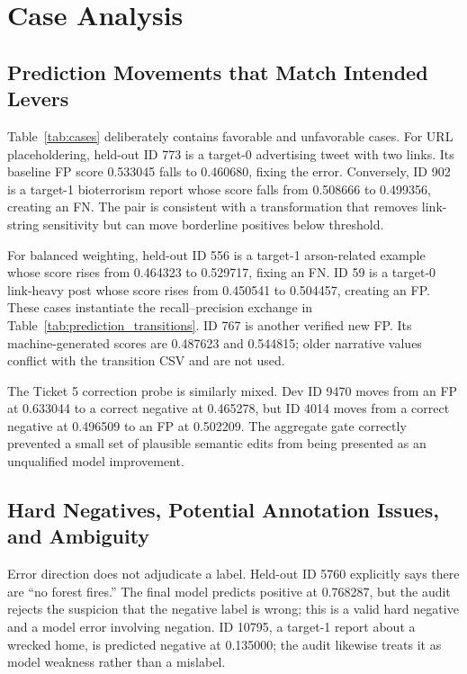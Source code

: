 \documentclass[conference]{IEEEtran}
\begin{document}
\section{Case Analysis}

\subsection{Prediction Movements that Match Intended Levers}

Table~\ref{tab:cases} deliberately contains favorable and unfavorable cases. For URL placeholdering, held-out ID 773 is a target-0 advertising tweet with two links. Its baseline FP score 0.533045 falls to 0.460680, fixing the error. Conversely, ID 902 is a target-1 bioterrorism report whose score falls from 0.508666 to 0.499356, creating an FN. The pair is consistent with a transformation that removes link-string sensitivity but can move borderline positives below threshold.

For balanced weighting, held-out ID 556 is a target-1 arson-related example whose score rises from 0.464323 to 0.529717, fixing an FN. ID 59 is a target-0 link-heavy post whose score rises from 0.450541 to 0.504457, creating an FP. These cases instantiate the recall--precision exchange in Table~\ref{tab:prediction_transitions}. ID 767 is another verified new FP. Its machine-generated scores are 0.487623 and 0.544815; older narrative values conflict with the transition CSV and are not used.

The Ticket 5 correction probe is similarly mixed. Dev ID 9470 moves from an FP at 0.633044 to a correct negative at 0.465278, but ID 4014 moves from a correct negative at 0.496509 to an FP at 0.502209. The aggregate gate correctly prevented a small set of plausible semantic edits from being presented as an unqualified model improvement.



\subsection{Hard Negatives, Potential Annotation Issues, and Ambiguity}

Error direction does not adjudicate a label. Held-out ID 5760 explicitly says there are ``no forest fires.'' The final model predicts positive at 0.768287, but the audit rejects the suspicion that the negative label is wrong; this is a valid hard negative and a model error involving negation. ID 10795, a target-1 report about a wrecked home, is predicted negative at 0.135000; the audit likewise treats it as model weakness rather than a mislabel.
\end{document}
